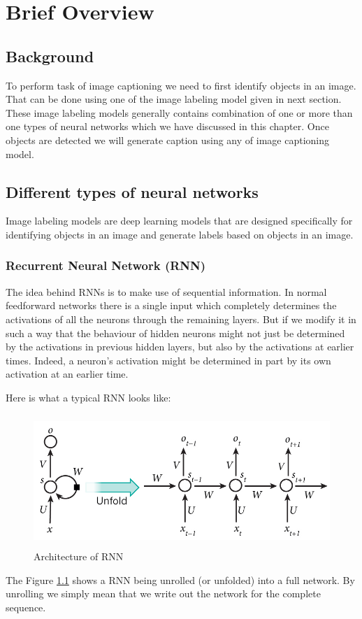 \chapter{Brief Overview}\label{Brief Overview}
\section{Background}
To perform task of image captioning we need to first identify objects in an image. That can be done using one of the image labeling model given in next section. These image labeling models generally contains combination of one or more than one types of neural networks which we have discussed in this chapter. Once objects are detected we will generate caption using any of image captioning model.
\section{Different types of neural networks}
Image labeling models are deep learning models that are designed specifically for identifying objects in an image and generate labels based on objects in an image.
\subsection{Recurrent Neural Network (RNN)}

The idea behind RNNs is to make use of sequential information. In normal feedforward networks there is a single input which completely determines the activations of all the neurons through the remaining layers. But if we modify it in such a way that the behaviour of hidden neurons might not just be determined by the activations in previous hidden layers, but also by the activations at earlier times. Indeed, a neuron's activation might be determined in part by its own activation at an earlier time. 

 Here is what a typical RNN looks like:

\begin{figure}[h]
\begin{center}
     \includegraphics[width=13cm,height=5cm]{img/rnn}
     \caption[Architecture of RNN]{Architecture of RNN \cite{rnnintro}}
     \label{rnn}
\end{center}
\end{figure}
The Figure \ref{rnn} shows a RNN being unrolled (or unfolded) into a full network. By unrolling we simply mean that we write out the network for the complete sequence.

